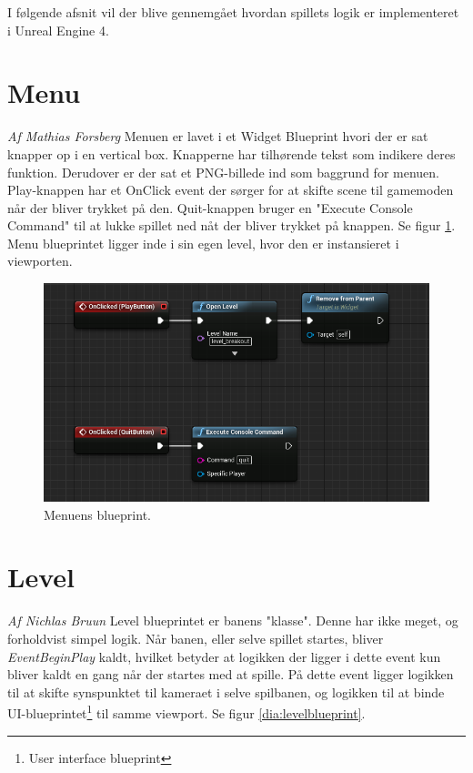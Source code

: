I følgende afsnit vil der blive gennemgået hvordan spillets logik er implementeret i Unreal Engine 4.

\section{Menu}
\textit{Af Mathias Forsberg}\newline
Menuen er lavet i et Widget Blueprint hvori der er sat knapper op i en vertical box. Knapperne har tilhørende tekst som indikere deres funktion. Derudover er der sat et PNG-billede ind som baggrund for menuen. Play-knappen har et OnClick event der sørger for at skifte scene til gamemoden når der bliver trykket på den. Quit-knappen bruger en  "Execute Console Command" til at lukke spillet ned nåt der bliver trykket på knappen. Se figur \ref{dia:menublueprint}. Menu blueprintet ligger inde i sin egen level, hvor den er instansieret i viewporten.

\begin{figure}
	\begin{center}
		\caption{Menuens blueprint.}
		\label{dia:menublueprint}
		\includegraphics[width=0.80\linewidth]{pictures/blueprints/menu_blueprint}
	\end{center}
\end{figure}

\section{Level}
\textit{Af Nichlas Bruun}\newline
Level blueprintet er banens "klasse". Denne har ikke meget, og forholdvist simpel logik. Når banen, eller selve spillet startes, bliver \textit{EventBeginPlay} kaldt, hvilket betyder at logikken der ligger i dette event kun bliver kaldt en gang når der startes med at spille. På dette event ligger logikken til at skifte synspunktet til kameraet i selve spilbanen, og logikken til at binde UI-blueprintet\footnote{User interface blueprint} til samme viewport. Se figur \ref{dia:levelblueprint}.

